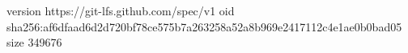 version https://git-lfs.github.com/spec/v1
oid sha256:af6dfaad6d2d720bf78ce575b7a263258a52a8b969e2417112c4e1ae0b0bad05
size 349676
